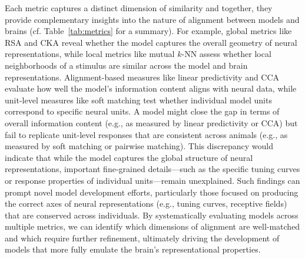 Each metric captures a distinct dimension of similarity and together, they provide complementary insights into the nature of alignment between models and brains (cf. Table~\ref{tab:metrics} for a summary). For example, global metrics like RSA and CKA reveal whether the model captures the overall geometry of neural representations, while local metrics like mutual $k$-NN assess whether local neighborhoods of a stimulus are similar across the model and brain representations. Alignment-based measures like linear predictivity and CCA evaluate how well the model’s information content aligns with neural data, while unit-level measures like soft matching test whether individual model units correspond to specific neural units. A model might close the gap in terms of overall information content (e.g., as measured by linear predictivity or CCA) but fail to replicate unit-level responses that are consistent across animals (e.g., as measured by soft matching or pairwise matching). This discrepancy would indicate that while the model captures the global structure of neural representations, important fine-grained details---such as the specific tuning curves or response properties of individual units---remain unexplained. Such findings can prompt novel model development efforts, particularly those focused on producing the correct axes of neural representations (e.g., tuning curves, receptive fields) that are conserved across individuals. By systematically evaluating models across multiple metrics, we can identify which dimensions of alignment are well-matched and which require further refinement, ultimately driving the development of models that more fully emulate the brain’s representational properties.

